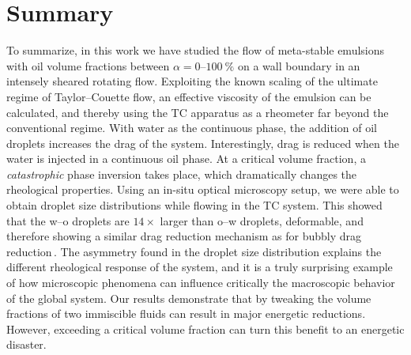 \section{Summary}%
\fi%
\indent To summarize, in this work we have studied the flow of meta-stable emulsions with oil volume fractions between $\alpha=0$--$\SI{100}{\percent}$ on a wall boundary in an intensely sheared rotating flow. Exploiting the known scaling of the ultimate regime of Taylor--Couette flow, an effective viscosity of the emulsion can be calculated, and thereby using the TC apparatus as a rheometer far beyond the conventional regime.  
With water as the continuous phase, the addition of oil droplets increases the drag of the system. Interestingly, drag is reduced when the water is injected in a continuous oil phase. 
At a critical volume fraction, a \emph{catastrophic} phase inversion takes place, which dramatically changes the rheological properties.   
Using an in-situ optical microscopy setup, we were able to obtain droplet size distributions while flowing in the TC system. This showed that the w--o droplets are $14\times$ larger than o--w droplets, deformable, and therefore showing a similar drag reduction mechanism as for bubbly drag reduction\,\cite{vandenBerg2007, Verschoof2016}.  
The asymmetry found in the droplet size distribution explains the different rheological response of the system, and it is a truly surprising example of how microscopic phenomena can influence critically the macroscopic behavior of the global system. Our results demonstrate that by tweaking the volume fractions of two immiscible fluids can result in major energetic reductions.  However, exceeding a critical volume fraction can turn this benefit to an energetic disaster.
%
\graphicspath{{fig/}}


